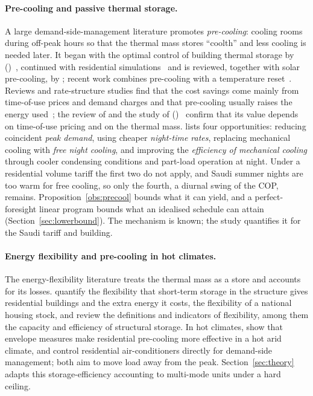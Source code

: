 \documentclass[10pt,a4paper,twocolumn]{article}
\newcommand{\citey}[1]{\citeauthor{#1} (\citeyear{#1})~\citep{#1}}
\theoremstyle{definition}
\begin{document}
\paragraph{Pre-cooling and passive thermal storage.}
A large demand-side-management literature promotes \emph{pre-cooling}: cooling rooms during off-peak hours so that the thermal mass stores ``coolth'' and less cooling is needed later. It began with the optimal control of building thermal storage by \citey{braun1990}, continued with residential simulations~\citep{turner2015peak} and is reviewed, together with solar pre-cooling, by \citet{naderi2022precool}; recent work combines pre-cooling with a temperature reset~\citep{wang2023precool}. Reviews and rate-structure studies find that the cost savings come mainly from time-of-use prices and demand charges and that pre-cooling usually raises the energy used~\citep{braun2003load,morgan2007impact,turner2015peak}; the review of \citet{naderi2022precool} and the study of \citey{mayes2024precool} confirm that its value depends on time-of-use pricing and on the thermal mass. \citet{braun1990} lists four opportunities: reducing coincident \emph{peak demand}, using cheaper \emph{night-time rates}, replacing mechanical cooling with \emph{free night cooling}, and improving the \emph{efficiency of mechanical cooling} through cooler condensing conditions and part-load operation at night. Under a residential volume tariff the first two do not apply, and Saudi summer nights are too warm for free cooling, so only the fourth, a diurnal swing of the COP, remains. Proposition~\ref{obs:precool} bounds what it can yield, and a perfect-foresight linear program bounds what an idealised schedule can attain (Section~\ref{sec:lowerbound}). The mechanism is known; the study quantifies it for the Saudi tariff and building.

\paragraph{Energy flexibility and pre-cooling in hot climates.}
The energy-flexibility literature treats the thermal mass as a store and accounts for its losses. \citet{ledreau2016flex} quantify the flexibility that short-term storage in the structure gives residential buildings and the extra energy it costs, \citet{canet2023flex} the flexibility of a national housing stock, and \citet{reynders2018flex} review the definitions and indicators of flexibility, among them the capacity and efficiency of structural storage. In hot climates, \citet{arababadi2017precool} show that envelope measures make residential pre-cooling more effective in a hot arid climate, and \citet{ramacuriel2022dlc} control residential air-conditioners directly for demand-side management; both aim to move load away from the peak. Section~\ref{sec:theory} adapts this storage-efficiency accounting to multi-mode units under a hard ceiling.
\end{document}
